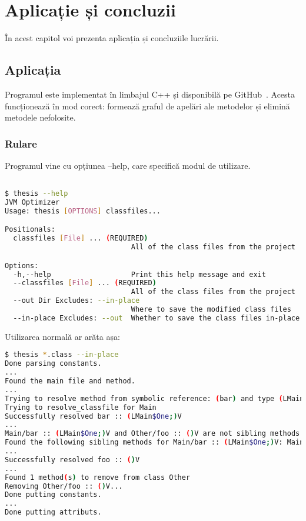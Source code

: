 \chapter{Aplicație și concluzii}

În acest capitol voi prezenta aplicația și concluziile lucrării.

\section{Aplicația}

Programul este implementat în limbajul C++ și disponibilă pe
GitHub~\cite{project_sourcecode}.
Acesta funcționează în mod corect: formează graful de
apelări ale metodelor și elimină metodele nefolosite.

\subsection{Rulare}

Programul vine cu opțiunea --help, care specifică modul de utilizare.
\begin{lstlisting}[language=Bash]

$ thesis --help
JVM Optimizer
Usage: thesis [OPTIONS] classfiles...

Positionals:
  classfiles [File] ... (REQUIRED)
                              All of the class files from the project

Options:
  -h,--help                   Print this help message and exit
  --classfiles [File] ... (REQUIRED)
                              All of the class files from the project
  --out Dir Excludes: --in-place
                              Where to save the modified class files
  --in-place Excludes: --out  Whether to save the class files in-place

\end{lstlisting}

Utilizarea normală ar arăta așa:

\begin{lstlisting}[language=Bash]
$ thesis *.class --in-place
Done parsing constants.
...
Found the main file and method.
...
Trying to resolve method from symbolic reference: (bar) and type (LMain$One;)V.
Trying to resolve_classfile for Main
Successfully resolved bar :: (LMain$One;)V
...
Main/bar :: (LMain$One;)V and Other/foo :: ()V are not sibling methods
Found the following sibling methods for Main/bar :: (LMain$One;)V: Main/bar :: (LMain$One;)V;
...
Successfully resolved foo :: ()V
...
Found 1 method(s) to remove from class Other
Removing Other/foo :: ()V...
Done putting constants.
...
Done putting attributs.
\end{lstlisting}

